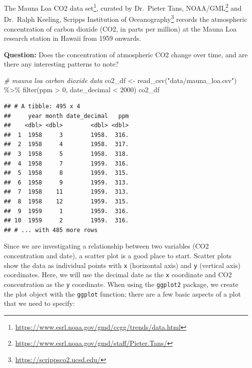 \documentclass[
]{krantz}
\makeatletter
\newenvironment{Shaded}{\begin{snugshade}}{\end{snugshade}}
\newcommand{\CommentTok}[1]{\textcolor[rgb]{0.37,0.37,0.37}{\textit{#1}}}
\newcommand{\DecValTok}[1]{\textcolor[rgb]{0.06,0.06,0.06}{#1}}
\newcommand{\FunctionTok}[1]{\textcolor[rgb]{0,0,0}{#1}}
\newcommand{\NormalTok}[1]{#1}
\newcommand{\OtherTok}[1]{\textcolor[rgb]{0.37,0.37,0.37}{#1}}
\newcommand{\SpecialCharTok}[1]{\textcolor[rgb]{0,0,0}{#1}}
\newcommand{\StringTok}[1]{\textcolor[rgb]{0.5,0.5,0.5}{#1}}
\renewcommand{\href}[2]{#2\footnote{\url{#1}}}
\newenvironment{kframe}{%
\medskip{}
\setlength{\fboxsep}{.8em}
 \def\at@end@of@kframe{}%
 \ifinner\ifhmode%
  \def\at@end@of@kframe{\end{minipage}}%
  \begin{minipage}{\columnwidth}%
 \fi\fi%
 \def\FrameCommand##1{\hskip\@totalleftmargin \hskip-\fboxsep
 \colorbox{shadecolor}{##1}\hskip-\fboxsep
     \hskip-\linewidth \hskip-\@totalleftmargin \hskip\columnwidth}%
 \MakeFramed {\advance\hsize-\width
   \@totalleftmargin\z@ \linewidth\hsize
   \@setminipage}}%
 {\par\unskip\endMakeFramed%
 \at@end@of@kframe}
\renewenvironment{Shaded}{\begin{kframe}}{\end{kframe}}
\makeatother
\begin{document}
The \href{https://www.esrl.noaa.gov/gmd/ccgg/trends/data.html}{Mauna Loa CO2 data set}, curated by \href{https://www.esrl.noaa.gov/gmd/staff/Pieter.Tans/}{Dr.~Pieter Tans, NOAA/GML} and \href{https://scrippsco2.ucsd.edu/}{Dr.~Ralph Keeling, Scripps Institution of Oceanography}
records the atmospheric concentration of carbon dioxide (CO2, in parts per million) at the Mauna Loa research station in Hawaii from 1959 onwards.

\textbf{Question:} Does the concentration of atmospheric CO2 change over time, and are there any interesting patterns to note?

\begin{Shaded}
\begin{Highlighting}[]
\CommentTok{\# mauna loa carbon dioxide data}
\NormalTok{co2\_df }\OtherTok{\textless{}{-}} \FunctionTok{read\_csv}\NormalTok{(}\StringTok{"data/mauna\_loa.csv"}\NormalTok{) }\SpecialCharTok{\%\textgreater{}\%}
  \FunctionTok{filter}\NormalTok{(ppm }\SpecialCharTok{\textgreater{}} \DecValTok{0}\NormalTok{, date\_decimal }\SpecialCharTok{\textless{}} \DecValTok{2000}\NormalTok{)}
\NormalTok{co2\_df}
\end{Highlighting}
\end{Shaded}

\begin{verbatim}
## # A tibble: 495 x 4
##     year month date_decimal   ppm
##    <dbl> <dbl>        <dbl> <dbl>
##  1  1958     3        1958.  316.
##  2  1958     4        1958.  317.
##  3  1958     5        1958.  318.
##  4  1958     7        1959.  316.
##  5  1958     8        1959.  315.
##  6  1958     9        1959.  313.
##  7  1958    11        1959.  313.
##  8  1958    12        1959.  315.
##  9  1959     1        1959.  316.
## 10  1959     2        1959.  316.
## # ... with 485 more rows
\end{verbatim}

Since we are investigating a relationship between two variables (CO2 concentration and date), a scatter plot is a good place to start. Scatter plots
show the data as individual points with \texttt{x} (horizontal axis) and \texttt{y} (vertical axis) coordinates. Here, we will use the decimal
date as the \texttt{x} coordinate
and CO2 concentration as the \texttt{y} coordinate. When using the \texttt{ggplot2} package, we create the plot object with the \texttt{ggplot} function; there are
a few basic aspects of a plot that we need to specify:
\end{document}
